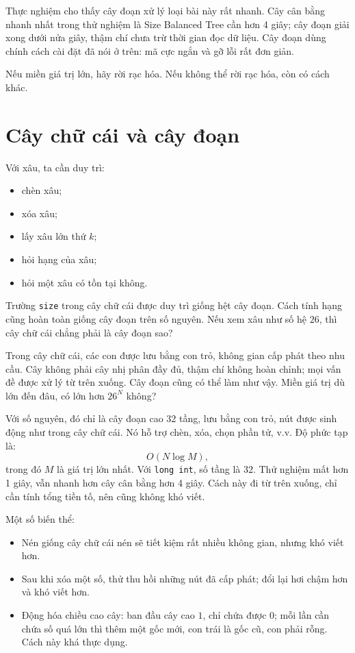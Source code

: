 \documentclass[11pt]{article}
\begin{document}
Thực nghiệm cho thấy cây đoạn xử lý loại bài này rất nhanh.  Cây cân bằng
nhanh nhất trong thử nghiệm là Size Balanced Tree cần hơn 4 giây; cây đoạn
giải xong dưới nửa giây, thậm chí chưa trừ thời gian đọc dữ liệu.  Cây đoạn
dùng chính cách cài đặt đã nói ở trên: mã cực ngắn và gỡ lỗi rất đơn giản.

Nếu miền giá trị lớn, hãy rời rạc hóa.  Nếu không thể rời rạc hóa, còn có cách
khác.

\section{Cây chữ cái và cây đoạn}

Với xâu, ta cần duy trì:
\begin{itemize}
  \item chèn xâu;
  \item xóa xâu;
  \item lấy xâu lớn thứ $k$;
  \item hỏi hạng của xâu;
  \item hỏi một xâu có tồn tại không.
\end{itemize}

Trường \texttt{size} trong cây chữ cái được duy trì giống hệt cây đoạn.  Cách
tính hạng cũng hoàn toàn giống cây đoạn trên số nguyên.  Nếu xem xâu như số hệ
$26$, thì cây chữ cái chẳng phải là cây đoạn sao?

Trong cây chữ cái, các con được lưu bằng con trỏ, không gian cấp phát theo nhu
cầu.  Cây không phải cây nhị phân đầy đủ, thậm chí không hoàn chỉnh; mọi vấn đề
được xử lý từ trên xuống.  Cây đoạn cũng có thể làm như vậy.  Miền giá trị dù
lớn đến đâu, có lớn hơn $26^N$ không?

Với số nguyên, đó chỉ là cây đoạn cao 32 tầng, lưu bằng con trỏ, nút được sinh
động như trong cây chữ cái.  Nó hỗ trợ chèn, xóa, chọn phần tử, v.v.  Độ phức
tạp là:
\[
  O(N\log M),
\]
trong đó $M$ là giá trị lớn nhất.  Với \texttt{long int}, số tầng là $32$.  Thử
nghiệm mất hơn 1 giây, vẫn nhanh hơn cây cân bằng hơn 4 giây.  Cách này đi từ
trên xuống, chỉ cần tính tổng tiền tố, nên cũng không khó viết.

Một số biến thể:
\begin{itemize}
  \item Nén giống cây chữ cái nén sẽ tiết kiệm rất nhiều không gian, nhưng khó
  viết hơn.
  \item Sau khi xóa một số, thử thu hồi những nút đã cấp phát; đổi lại hơi chậm
  hơn và khó viết hơn.
  \item Động hóa chiều cao cây: ban đầu cây cao $1$, chỉ chứa được $0$; mỗi lần
  cần chứa số quá lớn thì thêm một gốc mới, con trái là gốc cũ, con phải rỗng.
  Cách này khá thực dụng.
\end{itemize}
\end{document}
